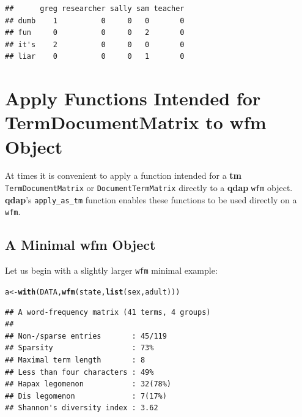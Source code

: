 \documentclass{article}\usepackage[]{graphicx}\usepackage[]{color}
\makeatletter
\newcommand{\hlstd}[1]{\textcolor[rgb]{0.345,0.345,0.345}{#1}}%
\newcommand{\hlkwb}[1]{\textcolor[rgb]{0.69,0.353,0.396}{#1}}%
\newcommand{\hlkwd}[1]{\textcolor[rgb]{0.737,0.353,0.396}{\textbf{#1}}}%
\newenvironment{kframe}{%
 \def\at@end@of@kframe{}%
 \ifinner\ifhmode%
  \def\at@end@of@kframe{\end{minipage}}%
  \begin{minipage}{\columnwidth}%
 \fi\fi%
 \def\FrameCommand##1{\hskip\@totalleftmargin \hskip-\fboxsep
 \colorbox{shadecolor}{##1}\hskip-\fboxsep
     \hskip-\linewidth \hskip-\@totalleftmargin \hskip\columnwidth}%
 \MakeFramed {\advance\hsize-\width
   \@totalleftmargin\z@ \linewidth\hsize
   \@setminipage}}%
 {\par\unskip\endMakeFramed%
 \at@end@of@kframe}
\newenvironment{knitrout}{}{} %
\makeatother
\begin{document}
\begin{knitrout}
\color{fgcolor}\begin{kframe}
\begin{verbatim}
##      greg researcher sally sam teacher
## dumb    1          0     0   0       0
## fun     0          0     0   2       0
## it's    2          0     0   0       0
## liar    0          0     0   1       0
\end{verbatim}
\end{kframe}
\end{knitrout}



\section{Apply Functions Intended for TermDocumentMatrix to wfm Object}

\hspace{.4cm} At times it is convenient to apply a function intended for a \textbf{tm} \texttt{TermDocumentMatrix} or \texttt{DocumentTermMatrix} directly to a \textbf{qdap} \texttt{wfm} object.  \textbf{qdap}'s \texttt{apply\_as\_tm} function enables these functions to be used directly on a \texttt{wfm}.

\subsection{A Minimal wfm Object}

\hspace{.4cm} Let us begin with a slightly larger \texttt{wfm} minimal example:

\begin{knitrout}
\color{fgcolor}\begin{kframe}
\begin{alltt}
\hlstd{a} \hlkwb{<-} \hlkwd{with}\hlstd{(DATA,} \hlkwd{wfm}\hlstd{(state,} \hlkwd{list}\hlstd{(sex, adult)))}
\end{alltt}
\end{kframe}
\end{knitrout}


\begin{knitrout}
\color{fgcolor}\begin{kframe}
\begin{verbatim}
## A word-frequency matrix (41 terms, 4 groups)
## 
## Non-/sparse entries       : 45/119
## Sparsity                  : 73%
## Maximal term length       : 8
## Less than four characters : 49%
## Hapax legomenon           : 32(78%)
## Dis legomenon             : 7(17%)
## Shannon's diversity index : 3.62
\end{verbatim}
\end{kframe}
\end{knitrout}
\end{document}
